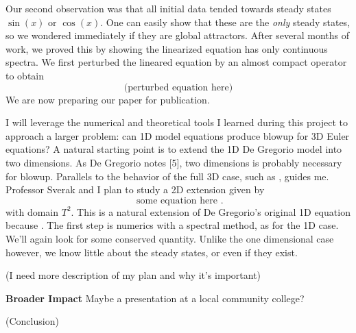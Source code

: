 \documentclass[12pt]{article}
\begin{document}
Our second observation was that all initial data tended towards steady states $\sin(x)$ or $\cos(x)$. One can easily show that these are the \textit{only} steady states, so we wondered immediately if they are global attractors. After several months of work, we proved this by showing the linearized equation has only continuous spectra. We first perturbed the lineared equation by an almost compact operator to obtain 
\[
	\textrm{(perturbed equation here)}
\]
We are now preparing our paper for publication.

I will leverage the numerical and theoretical tools I learned during this project to approach a larger problem: can 1D model equations produce blowup for 3D Euler equations? A natural starting point is to extend the 1D De Gregorio model into two dimensions. As De Gregorio notes [5], two dimensions is probably necessary for blowup. Parallels to the behavior of the full 3D case, such as , guides me. Professor Sverak and I plan to study a 2D extension given by
\[
	\textrm{ some equation here }.
\]
with domain $T^2$. This is a natural extension of De Gregorio's original 1D equation because . The first step is numerics with a spectral method, as for the 1D case. We'll again look for some conserved quantity. Unlike the one dimensional case however, we know little about the steady states, or even if they exist. 

(I need more description of my plan and why it's important)

\textbf{Broader Impact}
Maybe a presentation at a local community college?

(Conclusion)
\end{document}
